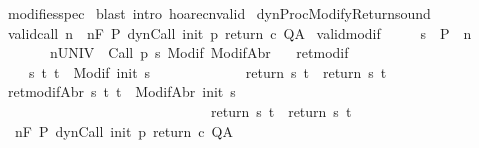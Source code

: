 \begin{isabellebody}
\isamarkupfalse%
\ modifies{\isacharunderscore}spec\isanewline
{}\isamarkupfalse%
\ {\isacharparenleft}blast\ intro{\isacharcolon}\ hoare{\isacharunderscore}cnvalid{\isacharparenright}\isanewline
{}\isamarkupfalse%
%
\endisatagproof
{\isafoldproof}%
%
\isadelimproof
%
\endisadelimproof
%
\isamarkuptrue%
\isamarkupfalse%
\ dynProcModifyReturn{\isacharunderscore}sound{\isacharcolon}\isanewline
{}\ valid{\isacharunderscore}call{\isacharcolon}\ {\isachardoublequoteopen}{\isasymAnd}n{\isachardot}\ {\isasymGamma}{\isacharcomma}{\isasymTheta}\ {\isasymTurnstile}n{\isacharcolon}\isactrlbsub {\isacharslash}F\isactrlesub \ P\ dynCall\ init\ p\ return{\isacharprime}\ c\ Q{\isacharcomma}A{\isachardoublequoteclose}\isanewline
{}\ valid{\isacharunderscore}modif{\isacharcolon}\ \isanewline
\ \ \ \ {\isachardoublequoteopen}{\isasymforall}s\ {\isasymin}\ P{\isachardot}\ {\isasymforall}{\isasymsigma}{\isachardot}\ {\isasymforall}n{\isachardot}\ \isanewline
\ \ \ \ \ \ \ {\isasymGamma}{\isacharcomma}{\isasymTheta}{\isasymTurnstile}n{\isacharcolon}\isactrlbsub {\isacharslash}UNIV\isactrlesub \ {\isacharbraceleft}{\isasymsigma}{\isacharbraceright}\ Call\ {\isacharparenleft}p\ s{\isacharparenright}\ {\isacharparenleft}Modif\ {\isasymsigma}{\isacharparenright}{\isacharcomma}{\isacharparenleft}ModifAbr\ {\isasymsigma}{\isacharparenright}{\isachardoublequoteclose}\ \isanewline
{}\ ret{\isacharunderscore}modif{\isacharcolon}\isanewline
\ \ \ \ {\isachardoublequoteopen}{\isasymforall}s\ t{\isachardot}\ t\ {\isasymin}\ Modif\ {\isacharparenleft}init\ s{\isacharparenright}\ \isanewline
\ \ \ \ \ \ \ \ \ \ \ {\isasymlongrightarrow}\ return{\isacharprime}\ s\ t\ {\isacharequal}\ return\ s\ t{\isachardoublequoteclose}\isanewline
{}\ ret{\isacharunderscore}modifAbr{\isacharcolon}\ {\isachardoublequoteopen}{\isasymforall}s\ t{\isachardot}\ t\ {\isasymin}\ ModifAbr\ {\isacharparenleft}init\ s{\isacharparenright}\ \isanewline
\ \ \ \ \ \ \ \ \ \ \ \ \ \ \ \ \ \ \ \ \ \ \ \ \ \ \ \ \ {\isasymlongrightarrow}\ return{\isacharprime}\ s\ t\ {\isacharequal}\ return\ s\ t{\isachardoublequoteclose}\isanewline
{}\ {\isachardoublequoteopen}{\isasymGamma}{\isacharcomma}{\isasymTheta}\ {\isasymTurnstile}n{\isacharcolon}\isactrlbsub {\isacharslash}F\isactrlesub \ P\ {\isacharparenleft}dynCall\ init\ p\ return\ c{\isacharparenright}\ Q{\isacharcomma}A{\isachardoublequoteclose}\isanewline
%
\isadelimproof
%
\endisadelimproof

\end{isabellebody}
